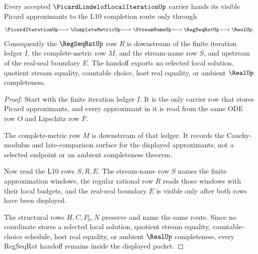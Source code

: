 \begin{theorem}
\label{thm:picard-lindelof-regseqrat-handoff}
Every accepted $\PicardLindelofLocalIterationUp$ carrier hands its visible Picard approximants to the L10 completion route only through
$$
\PicardIterationUp \longmapsto \CompleteMetricUp \longmapsto \StreamNameUp \longmapsto \RegSeqRatUp \longmapsto \RealUp .
$$
Consequently the $\RegSeqRatUp$ row $R$ is downstream of the finite iteration ledger $I$, the complete-metric row $M$, and the stream-name row $S$, and upstream of the real-seal boundary $E$. The handoff exports no selected local solution, quotient stream equality, countable choice, host real equality, or ambient $\RealUp$ completeness.
\end{theorem}
\begin{proof}
Start with the finite iteration ledger $I$. It is the only carrier row that stores Picard approximants, and every approximant in it is read from the same ODE row $O$ and Lipschitz row $F$.

The complete-metric row $M$ is downstream of that ledger. It records the Cauchy-modulus and late-comparison surface for the displayed approximants, not a selected endpoint or an ambient completeness theorem.

Now read the L10 rows $S,R,E$. The stream-name row $S$ names the finite approximation windows, the regular rational row $R$ reads those windows with their local budgets, and the real-seal boundary $E$ is visible only after both rows have been displayed.

The structural rows $H,C,P_0,N$ preserve and name the same route. Since no coordinate stores a selected local solution, quotient stream equality, countable-choice schedule, host real equality, or ambient $\RealUp$ completeness, every RegSeqRat handoff remains inside the displayed packet.
\end{proof}



